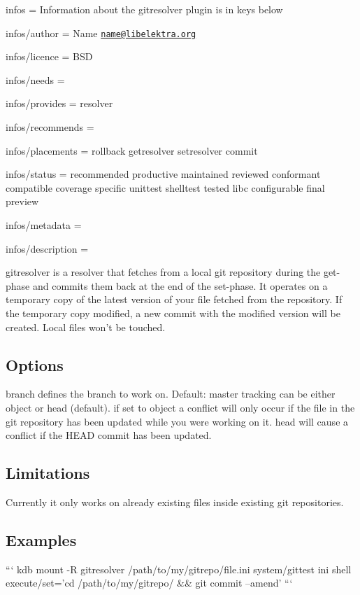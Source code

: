 
\begin{DoxyItemize}
\item infos = Information about the gitresolver plugin is in keys below
\item infos/author = Name \href{mailto:name@libelektra.org}{\tt name@libelektra.\+org}
\item infos/licence = B\+S\+D
\item infos/needs =
\item infos/provides = resolver
\item infos/recommends =
\item infos/placements = rollback getresolver setresolver commit
\item infos/status = recommended productive maintained reviewed conformant compatible coverage specific unittest shelltest tested libc configurable final preview
\item infos/metadata =
\item infos/description =
\end{DoxyItemize}

gitresolver is a resolver that fetches from a local git repository during the get-\/phase and commits them back at the end of the set-\/phase. It operates on a temporary copy of the latest version of your file fetched from the repository. If the temporary copy modified, a new commit with the modified version will be created. Local files won't be touched.

\subsection*{Options}

{\ttfamily branch} defines the branch to work on. Default\+: master {\ttfamily tracking} can be either {\ttfamily object} or {\ttfamily head} (default). if set to {\ttfamily object} a conflict will only occur if the file in the git repository has been updated while you were working on it. {\ttfamily head} will cause a conflict if the {\ttfamily H\+E\+A\+D} commit has been updated.

\subsection*{Limitations}

Currently it only works on already existing files inside existing git repositories.

\subsection*{Examples}

``` kdb mount -\/\+R gitresolver /path/to/my/gitrepo/file.ini system/gittest ini shell execute/set='cd /path/to/my/gitrepo/ \&\& git commit --amend' ``` 